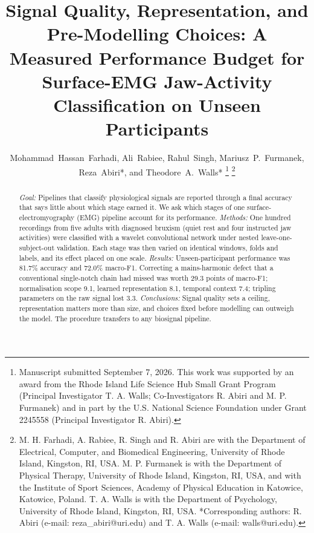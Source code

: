 \documentclass[journal]{IEEEtran}
\begin{document}

\setcounter{page}{1}

\title{Signal Quality, Representation, and Pre-Modelling Choices: A Measured Performance Budget for Surface-EMG Jaw-Activity Classification on Unseen Participants}

\author{Mohammad~Hassan~Farhadi, Ali~Rabiee, Rahul~Singh, Mariusz~P.~Furmanek, Reza~Abiri*, and Theodore~A.~Walls*%
\thanks{Manuscript submitted September 7, 2026. This work was supported by an award from the Rhode Island Life Science Hub Small Grant Program (Principal Investigator T. A. Walls; Co-Investigators R. Abiri and M. P. Furmanek) and in part by the U.S. National Science Foundation under Grant 2245558 (Principal Investigator R. Abiri).}%
\thanks{M. H. Farhadi, A. Rabiee, R. Singh and R. Abiri are with the Department of Electrical, Computer, and Biomedical Engineering, University of Rhode Island, Kingston, RI, USA. M. P. Furmanek is with the Department of Physical Therapy, University of Rhode Island, Kingston, RI, USA, and with the Institute of Sport Sciences, Academy of Physical Education in Katowice, Katowice, Poland. T. A. Walls is with the Department of Psychology, University of Rhode Island, Kingston, RI, USA. *Corresponding authors: R. Abiri (e-mail: reza\_abiri@uri.edu) and T. A. Walls (e-mail: walls@uri.edu).}}


\maketitle\thispagestyle{fancy}

\begin{abstract}
\textit{Goal:} Pipelines that classify physiological signals are reported through a final accuracy that says little about which stage earned it. We ask which stages of one surface-electromyography (EMG) pipeline account for its performance. \textit{Methods:} One hundred recordings from five adults with diagnosed bruxism (quiet rest and four instructed jaw activities) were classified with a wavelet convolutional network under nested leave-one-subject-out validation. Each stage was then varied on identical windows, folds and labels, and its effect placed on one scale. \textit{Results:} Unseen-participant performance was 81.7\% accuracy and 72.0\% macro-F1. Correcting a mains-harmonic defect that a conventional single-notch chain had missed was worth 29.3 points of macro-F1; normalisation scope 9.1, learned representation 8.1, temporal context 7.4; tripling parameters on the raw signal lost 3.3. \textit{Conclusions:} Signal quality sets a ceiling, representation matters more than size, and choices fixed before modelling can outweigh the model. The procedure transfers to any biosignal pipeline.
\end{abstract}
\end{document}
